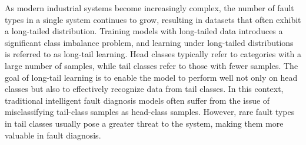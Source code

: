 \documentclass[master]{thesis-uestc}
\begin{document}
\begin{englishabstract}
    As modern industrial systems become increasingly complex, the number of fault types in a single system continues to grow, resulting in datasets that often exhibit a long-tailed distribution. Training models with long-tailed data introduces a significant class imbalance problem, and learning under long-tailed distributions is referred to as long-tail learning. Head classes typically refer to categories with a large number of samples, while tail classes refer to those with fewer samples. The goal of long-tail learning is to enable the model to perform well not only on head classes but also to effectively recognize data from tail classes. In this context, traditional intelligent fault diagnosis models often suffer from the issue of misclassifying tail-class samples as head-class samples. However, rare fault types in tail classes usually pose a greater threat to the system, making them more valuable in fault diagnosis.


\end{englishabstract}
\end{document}
